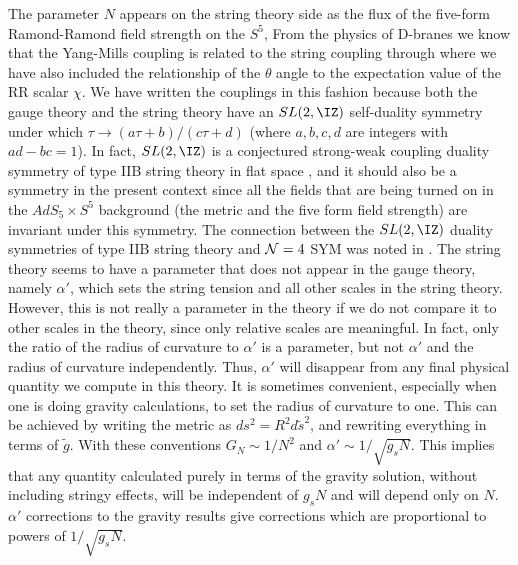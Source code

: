 The parameter $N$ appears on the string theory side as the flux
of the five-form Ramond-Ramond field strength on the $S^5$,
  From the physics of D-branes we know that 
 the Yang-Mills coupling is 
related to the string coupling
through \cite{Polchinski:1995mt,Douglas:1995bn}
where we have also included the relationship of the $\theta$ angle to
the expectation value of the RR scalar $\chi$. We have written the
couplings in this fashion because both the gauge theory and the string
theory have an $SL(2,\IZ)$ self-duality symmetry under which $\tau \to
(a \tau +b) / (c \tau + d)$ (where $a,b,c,d$ are integers with
$ad-bc=1$). In fact, $SL(2,\IZ)$ is a conjectured strong-weak coupling
duality symmetry of type IIB string theory in flat space
\cite{Hull:1995ys}, and it should also be a symmetry in the present
context since all the fields that are being turned on in the $AdS_5 \times
S^5$ background (the metric and the five form field strength) are
invariant under this symmetry.  The connection between the $SL(2,\IZ)$
duality symmetries of type IIB string theory and ${\cal N} =4$ SYM was
noted in
\cite{Tseytlin:1996it,Green:1996qg,Douglas:1996du}. 
The string theory seems to have a parameter that does not appear in
the gauge theory, namely $\alpha'$, which sets the string tension and
all other scales in the string theory. However, this is not really a
parameter in the theory if we do not compare it to other scales in the
theory, since only relative scales are meaningful.  In fact, only the
ratio of the radius of curvature to $\alpha'$ is a parameter, but not
$\alpha'$ and the radius of curvature independently. Thus, $\alpha'$
will disappear from any final physical quantity we compute in this
theory.  It is sometimes
convenient, especially when one is doing gravity calculations, to set
the radius of curvature to one.  This can be achieved by writing the
metric as $ds^2 = R^2 d{\tilde s}^2$, and rewriting everything in terms
of $\tilde g$. With these conventions $ G_N \sim 1/N^2$ and $\alpha'
\sim 1/\sqrt{g_s N} $.  This implies that any quantity calculated purely
in terms of the gravity solution, without including stringy effects,
will be independent of $g_s N$ and will depend only on $N$.  $\alpha'$
corrections to the gravity results give corrections which are
proportional to powers of $1/\sqrt{g_s N}$.

